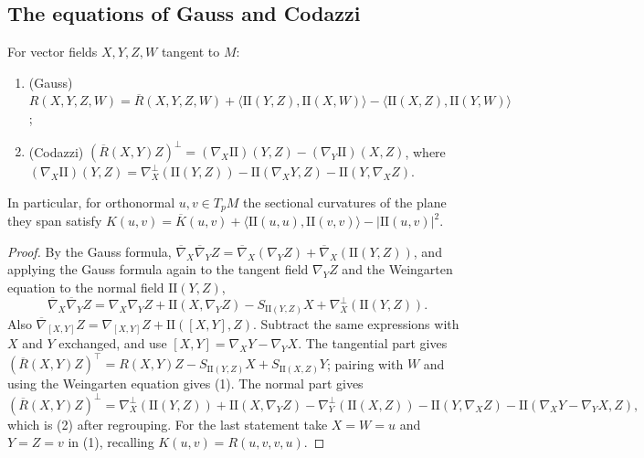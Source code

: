 \subsection{The equations of Gauss and Codazzi}\label{riemannian-geometry:subsection-gauss-codazzi}

\begin{theorem}\label{riemannian-geometry:theorem-gauss-codazzi}
For vector fields $X, Y, Z, W$ tangent to $M$:
\begin{enumerate}
\item (Gauss) $R(X, Y, Z, W) = \overline{R}(X, Y, Z, W) + \langle\mathrm{II}(Y, Z), \mathrm{II}(X, W)\rangle - \langle\mathrm{II}(X, Z), \mathrm{II}(Y, W)\rangle$;
\item (Codazzi) $(\overline{R}(X, Y)Z)^\perp = (\nabla_X\mathrm{II})(Y, Z) - (\nabla_Y\mathrm{II})(X, Z)$, where
$(\nabla_X\mathrm{II})(Y, Z) = \nabla^\perp_X(\mathrm{II}(Y, Z)) - \mathrm{II}(\nabla_XY, Z) - \mathrm{II}(Y, \nabla_XZ)$.
\end{enumerate}
In particular, for orthonormal $u, v \in T_pM$ the sectional curvatures of the plane they span satisfy
$K(u, v) = \overline{K}(u, v) + \langle\mathrm{II}(u, u), \mathrm{II}(v, v)\rangle - |\mathrm{II}(u, v)|^2$.
\end{theorem}

\begin{proof}
By the Gauss formula, $\overline{\nabla}_X\overline{\nabla}_YZ = \overline{\nabla}_X(\nabla_YZ) + \overline{\nabla}_X(\mathrm{II}(Y, Z))$, and applying the Gauss formula again to the tangent field
$\nabla_YZ$ and the Weingarten equation to the normal field $\mathrm{II}(Y, Z)$,
\[
\overline{\nabla}_X\overline{\nabla}_YZ = \nabla_X\nabla_YZ + \mathrm{II}(X, \nabla_YZ) - S_{\mathrm{II}(Y, Z)}X + \nabla^\perp_X(\mathrm{II}(Y, Z)).
\]
Also $\overline{\nabla}_{[X,Y]}Z = \nabla_{[X,Y]}Z + \mathrm{II}([X, Y], Z)$. Subtract the same expressions with $X$ and $Y$ exchanged, and use $[X, Y] = \nabla_XY - \nabla_YX$.
The tangential part gives $(\overline{R}(X, Y)Z)^\top = R(X, Y)Z - S_{\mathrm{II}(Y, Z)}X + S_{\mathrm{II}(X, Z)}Y$; pairing with $W$ and using the Weingarten equation gives (1). The
normal part gives
\[
(\overline{R}(X, Y)Z)^\perp = \nabla^\perp_X(\mathrm{II}(Y, Z)) + \mathrm{II}(X, \nabla_YZ) - \nabla^\perp_Y(\mathrm{II}(X, Z)) - \mathrm{II}(Y, \nabla_XZ) - \mathrm{II}(\nabla_XY - \nabla_YX, Z),
\]
which is (2) after regrouping. For the last statement take $X = W = u$ and $Y = Z = v$ in (1), recalling $K(u, v) = R(u, v, v, u)$.
\end{proof}

